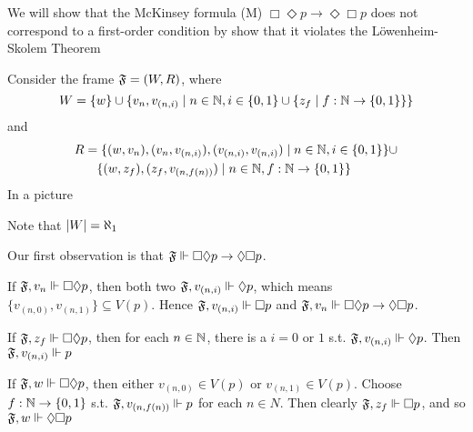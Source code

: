 \documentclass[11pt]{article}
\begin{document}
\begin{examplle}[]
We will show that the McKinsey formula (M) \(\Box\Diamond p\to\Diamond\Box
   p\) does not correspond to a first-order condition by show
that it violates 
the Löwenheim-Skolem Theorem

Consider the frame \(\mathfrak{F}=(W,R)\), where
\begin{equation*}
W=\{w\}\cup\{v_n,v_{(n,i)}\mid n\in\mathbb{N},i\in\{0,1\}\cup
\{z_f\mid f:\mathbb{N}\to\{0,1\}\}\}
\end{equation*}
and
\begin{align*}
R&=\{(w,v_n),(v_n,v_{(n,i)}),(v_{(n,i)},v_{(n,i)})\mid n\in\mathbb{N},i\in\{0,1\}\}\cup\\
&\quad\{(w,z_f),(z_f,v_{(n,f(n))})\mid n\in\mathbb{N},f:\mathbb{N}\to\{0,1\}\}
\end{align*}
In a picture
\begin{center}
\end{center}
Note that \(\abs{W}=\aleph_1\)

Our first observation is that \(\mathfrak{F}\Vdash\Box\Diamond p\to\Diamond\Box p\).

If \(\mathfrak{F},v_n\Vdash\Box\Diamond p\), then both two
\(\mathfrak{F},v_{(n,i)}\Vdash\Diamond p\), which means
\(\{v_{(n,0)},v_{(n,1)}\}\subseteq V(p)\). Hence \(\mathfrak{F},v_{(n,i)}\Vdash\Box
   p\) and \(\mathfrak{F},v_n\Vdash\Box\Diamond p\to\Diamond\Box p\).

If \(\mathfrak{F},z_f\Vdash\Box\Diamond p\), then for each \(n\in\mathbb{N}\), there is a
\(i=0\text{ or }1\) s.t. \(\mathfrak{F},v_{(n,i)}\Vdash\Diamond p\). Then
\(\mathfrak{F},v_{(n,i)}\Vdash p\)

If \(\mathfrak{F},w\Vdash\Box\Diamond p\), then either \(v_{(n,0)}\in V(p)\) or
\(v_{(n,1)}\in V(p)\). Choose \(f:\mathbb{N}\to\{0,1\}\) s.t.
\(\mathfrak{F},v_{(n,f(n))}\Vdash p\) for each \(n\in N\). Then clearly
\(\mathfrak{F},z_f\Vdash\Box p\), and so \(\mathfrak{F},w\Vdash\Diamond\Box p\)


\end{examplle}
\end{document}
